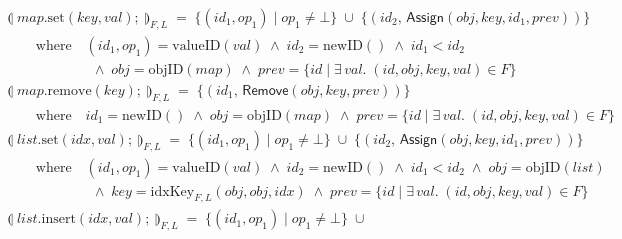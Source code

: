 \begin{align*}
    &\llparenthesis \;\mathit{map}.\mathrm{set}(\mathit{key}, \mathit{val});\; \rrparenthesis_{F,L} \;=\;
    \big\{ (\mathit{id}_1, \mathit{op}_1) \mid \mathit{op}_1 \neq \bot \big\} \;\cup\;
    \big\{ (\mathit{id}_2,\, \mathsf{Assign}(\mathit{obj}, \mathit{key}, \mathit{id}_1, \mathit{prev})) \big\} \\
    &\qquad\text{where}\quad (\mathit{id}_1, \mathit{op}_1) = \mathrm{valueID}(\mathit{val}) \;\wedge\;
    \mathit{id}_2 = \mathrm{newID()} \;\wedge\; \mathit{id}_1 < \mathit{id}_2 \\
    &\qquad\qquad\qquad\wedge\; \mathit{obj} = \mathrm{objID}(\mathit{map}) \;\wedge\;
    \mathit{prev} = \{ \mathit{id} \mid \exists\,\mathit{val}.\; (\mathit{id}, \mathit{obj}, \mathit{key}, \mathit{val}) \in F \} \\[10pt]
    &\llparenthesis \;\mathit{map}.\mathrm{remove}(\mathit{key});\; \rrparenthesis_{F,L} \;=\;
    \big\{ (\mathit{id}_1,\, \mathsf{Remove}(\mathit{obj}, \mathit{key}, \mathit{prev})) \big\} \\
    &\qquad\text{where}\quad \mathit{id}_1 = \mathrm{newID()} \;\wedge\;
    \mathit{obj} = \mathrm{objID}(\mathit{map}) \;\wedge\;
    \mathit{prev} = \{ \mathit{id} \mid \exists\,\mathit{val}.\; (\mathit{id}, \mathit{obj}, \mathit{key}, \mathit{val}) \in F \} \\[10pt]
    &\llparenthesis \;\mathit{list}.\mathrm{set}(\mathit{idx}, \mathit{val});\; \rrparenthesis_{F,L} \;=\;
    \big\{ (\mathit{id}_1, \mathit{op}_1) \mid \mathit{op}_1 \neq \bot \big\} \;\cup\;
    \big\{ (\mathit{id}_2,\, \mathsf{Assign}(\mathit{obj}, \mathit{key}, \mathit{id}_1, \mathit{prev})) \big\} \\
    &\qquad\text{where}\quad (\mathit{id}_1, \mathit{op}_1) = \mathrm{valueID}(\mathit{val}) \;\wedge\;
    \mathit{id}_2 = \mathrm{newID()} \;\wedge\; \mathit{id}_1 < \mathit{id}_2 \;\wedge\;
    \mathit{obj} = \mathrm{objID}(\mathit{list}) \\
    &\qquad\qquad\qquad\wedge\;
    \mathit{key} = \mathrm{idxKey}_{F,L}(\mathit{obj}, \mathit{obj}, \mathit{idx}) \;\wedge\;
    \mathit{prev} = \{ \mathit{id} \mid \exists\,\mathit{val}.\; (\mathit{id}, \mathit{obj}, \mathit{key}, \mathit{val}) \in F \} \\[10pt]
    &\llparenthesis \;\mathit{list}.\mathrm{insert}(\mathit{idx}, \mathit{val});\; \rrparenthesis_{F,L} \;=\;
    \big\{ (\mathit{id}_1, \mathit{op}_1) \mid \mathit{op}_1 \neq \bot \big\} \;\cup\;

\end{align*}
